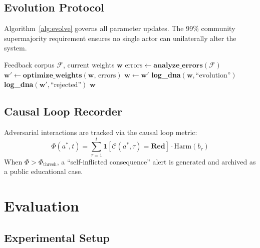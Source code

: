 \documentclass[conference]{IEEEtran}
\begin{document}
\subsection{Evolution Protocol}

Algorithm~\ref{alg:evolve} governs all parameter updates.
The 99\% community supermajority requirement ensures no single actor
can unilaterally alter the system.

\begin{algorithm}[t]
\caption{Constitutional Self-Evolution}
\label{alg:evolve}
\begin{algorithmic}[1]
\Require Feedback corpus $\mathcal{F}$, current weights $\mathbf{w}$
\State $\text{errors} \gets \textbf{analyze\_errors}(\mathcal{F})$
\State $\mathbf{w}' \gets \textbf{optimize\_weights}(\mathbf{w},\, \text{errors})$
    \State $\mathbf{w} \gets \mathbf{w}'$
    \State \textbf{log\_dna}$(\mathbf{w}, \text{``evolution''})$
  \Else
    \State \textbf{log\_dna}$(\mathbf{w}', \text{``rejected''})$
  \EndIf
\EndIf
\State \Return $\mathbf{w}$
\end{algorithmic}
\end{algorithm}

\subsection{Causal Loop Recorder}

Adversarial interactions are tracked via the causal loop metric:
\begin{equation}
  \Phi(a^*, t) = \sum_{\tau=1}^{t}
    \mathbf{1}[\mathcal{C}(a^*, \tau) = \textbf{Red}]
    \cdot \text{Harm}(b_\tau)
  \label{eq:causal_loop}
\end{equation}
When $\Phi > \Phi_{\text{thresh}}$, a ``self-inflicted consequence''
alert is generated and archived as a public educational case.

\section{Evaluation}

\subsection{Experimental Setup}
\end{document}
